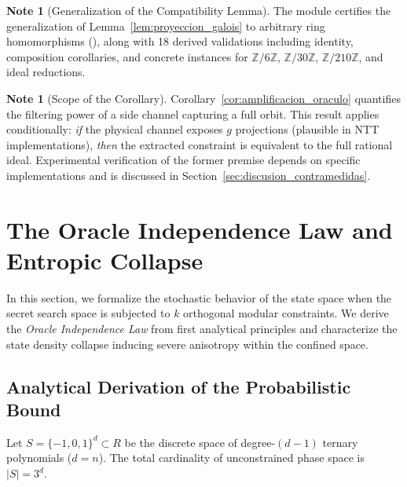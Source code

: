 \documentclass[11pt,a4paper]{article}
\theoremstyle{plain}
\theoremstyle{definition}
\newtheorem{remark}[teorema]{Note}
\numberwithin{equation}{section}
\newcommand{\ZZ}{\mathbb{Z}}
\begin{document}
\begin{remark}[Generalization of the Compatibility Lemma]
\label{rem:generalizacion_lema}
The  module certifies the generalization of Lemma~\ref{lem:proyeccion_galois} to arbitrary ring homomorphisms (), along with 18 derived validations including identity, composition corollaries, and concrete instances for $\ZZ/6\ZZ$, $\ZZ/30\ZZ$, $\ZZ/210\ZZ$, and ideal reductions.
\end{remark}

\begin{remark}[Scope of the Corollary]
\label{rem:alcance_corolario}
Corollary~\ref{cor:amplificacion_oraculo} quantifies the filtering power of a side channel capturing a full orbit. This result applies conditionally: \emph{if} the physical channel exposes $g$ projections (plausible in NTT implementations), \emph{then} the extracted constraint is equivalent to the full rational ideal. Experimental verification of the former premise depends on specific implementations and is discussed in Section~\ref{sec:discusion_contramedidas}.
\end{remark}

\section{The Oracle Independence Law and Entropic Collapse}
\label{sec:ley_oraculo}

In this section, we formalize the stochastic behavior of the state space when the secret search space is subjected to $k$ orthogonal modular constraints. We derive the \emph{Oracle Independence Law} from first analytical principles and characterize the state density collapse inducing severe anisotropy within the confined space.

\subsection{Analytical Derivation of the Probabilistic Bound}
\label{subsec:ley_independencia}

Let $S = \{-1, 0, 1\}^d \subset R$ be the discrete space of degree-$(d-1)$ ternary polynomials ($d = n$). The total cardinality of unconstrained phase space is $|S| = 3^d$.
\end{document}
